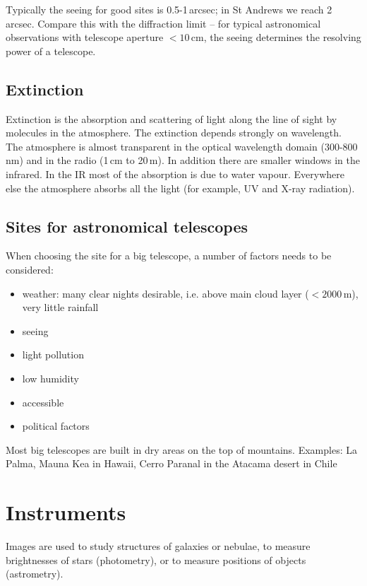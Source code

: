 Typically the seeing for good sites is 0.5-1\,arcsec; in St Andrews we reach 2\,arcsec. Compare this with the diffraction limit -- for typical astronomical observations with telescope aperture $<10$\,cm, the seeing determines the resolving power of a telescope.

\subsection{Extinction}

Extinction is the absorption and scattering of light along the line of sight by molecules in the atmosphere. The extinction depends strongly on wavelength. The atmosphere is almost transparent in the optical wavelength domain (300-800\,nm) and in the radio (1\,cm to 20\,m). In addition there are smaller windows in the infrared. In the IR most of the absorption is due to water vapour. Everywhere else the atmosphere absorbs all the light (for example, UV and X-ray radiation).  

\subsection{Sites for astronomical telescopes}

When choosing the site for a big telescope, a number of factors needs to be considered:

\begin{itemize}
\item{weather: many clear nights desirable, i.e. above main cloud layer ($<2000$\,m), very little rainfall}
\item{seeing}
\item{light pollution}
\item{low humidity}
\item{accessible}
\item{political factors}
\end{itemize}

Most big telescopes are built in dry areas on the top of mountains. Examples: La Palma, Mauna Kea in Hawaii, Cerro Paranal in the Atacama desert in Chile

\section{Instruments}

Images are used to study structures of galaxies or nebulae, to measure brightnesses of stars (photometry), or to measure positions of objects (astrometry).

